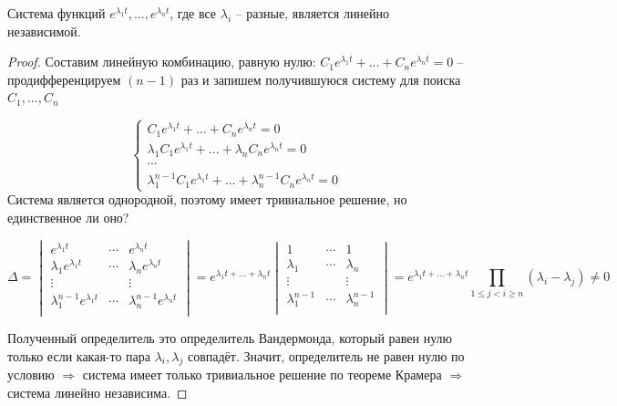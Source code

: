 \begin{lemma}
  Система функций $e^{\lambda_1t}, ..., e^{\lambda_n t}$, где все $\lambda_i$ -- разные, является линейно независимой.  
\end{lemma}
\begin{proof}
  Составим линейную комбинацию, равную нулю: $C_1 e^{\lambda_1 t} + ... + C_n e^{\lambda_n t} = 0$ -- продифференцируем $(n-1)$ раз и 
  запишем получившуюся систему для поиска $C_1, ..., C_n$

  \[
  \begin{cases}
    C_1 e^{\lambda_1 t} + ... + C_n e^{\lambda_n t} = 0 \\
    \lambda_1 C_1 e^{\lambda_1 t} + ... + \lambda_n C_n e^{\lambda_n t} = 0 \\
    \cdots \\
    \lambda_1^{n-1} C_1 e^{\lambda_1 t} + ... + \lambda_n^{n-1} C_n e^{\lambda_n t} = 0
  \end{cases} 
  \]
  Система является однородной, поэтому имеет тривиальное решение, но единственное ли оно? 

  \[ \Delta = \begin{vmatrix*}
    e^{\lambda_1 t} & \cdots & e^{\lambda_n t} \\
    \lambda_1 e^{\lambda_1 t} & \cdots & \lambda_n e^{\lambda_n t} \\
    \vdots &  & \vdots \\ 
    \lambda_1^{n-1} e^{\lambda_1 t} & \cdots & \lambda_n^{n-1} e^{\lambda_n t} \\
  \end{vmatrix*} = e^{\lambda_1 t + ... + \lambda_n t} \begin{vmatrix*}
    1 & \cdots & 1 \\
    \lambda_1  & \cdots & \lambda_n  \\
    \vdots &  & \vdots \\ 
    \lambda_1^{n-1}  & \cdots & \lambda_n^{n-1} \\
  \end{vmatrix*} = e^{\lambda_1 t + ... + \lambda_n t} \prod \limits_{1 \leq j < i \geq n} (\lambda_i - \lambda_j) \neq 0
  \]

  Полученный определитель это определитель Вандермонда, который равен нулю только если какая-то пара $\lambda_i, \lambda_j$ совпадёт. 
  Значит, определитель не равен нулю по условию $\Rightarrow$ система имеет только тривиальное решение по теореме Крамера $\Rightarrow$ система линейно независима.
\end{proof}


